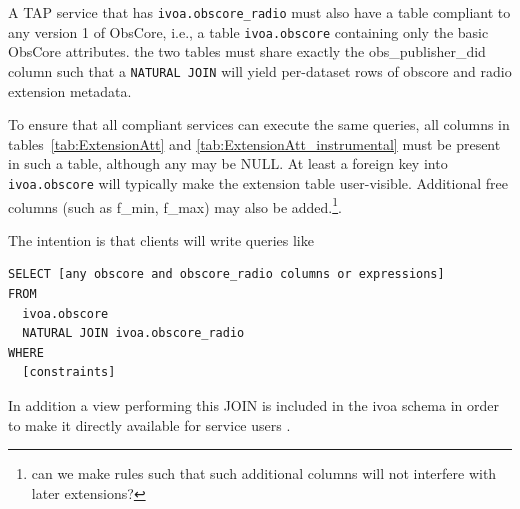 \documentclass[11pt,a4paper]{ivoa}
\begin{document}

A TAP service that has \verb|ivoa.obscore_radio| must also have a table
compliant to any version 1 of ObsCore, i.e., a table
\verb|ivoa.obscore| containing only the basic ObsCore attributes.
the two tables must share exactly the obs\_publisher\_did 
column such
that a \verb|NATURAL JOIN| will yield per-dataset rows of obscore and
radio extension metadata.  

To ensure that all compliant services can execute the same queries,
all columns in tables~\ref{tab:ExtensionAtt} and \ref{tab:ExtensionAtt_instrumental} must be present in such a
table, although any may be NULL. At least a foreign key into \verb|ivoa.obscore| will typically
make the extension table user-visible. Additional free columns (such as f\_min, f\_max) may also
be added.\footnote{can we make rules such that such additional columns
will not interfere with later extensions?}.

The intention is that clients will write queries like
\begin{lstlisting}
SELECT [any obscore and obscore_radio columns or expressions]
FROM
  ivoa.obscore
  NATURAL JOIN ivoa.obscore_radio
WHERE
  [constraints]
\end{lstlisting}

In addition a view performing this JOIN is included in the ivoa schema in
order to make it directly available for service users . 
\end{document}
